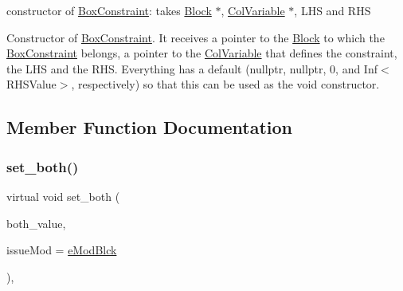 constructor of \mbox{\hyperlink{class_s_m_spp__di__unipi__it_1_1_box_constraint}{Box\+Constraint}}\+: takes \mbox{\hyperlink{class_s_m_spp__di__unipi__it_1_1_block}{Block}} $\ast$, \mbox{\hyperlink{class_s_m_spp__di__unipi__it_1_1_col_variable}{Col\+Variable}} $\ast$, L\+HS and R\+HS 

Constructor of \mbox{\hyperlink{class_s_m_spp__di__unipi__it_1_1_box_constraint}{Box\+Constraint}}. It receives a pointer to the \mbox{\hyperlink{class_s_m_spp__di__unipi__it_1_1_block}{Block}} to which the \mbox{\hyperlink{class_s_m_spp__di__unipi__it_1_1_box_constraint}{Box\+Constraint}} belongs, a pointer to the \mbox{\hyperlink{class_s_m_spp__di__unipi__it_1_1_col_variable}{Col\+Variable}} that defines the constraint, the L\+HS and the R\+HS. Everything has a default (nullptr, nullptr, 0, and Inf$<$\+R\+H\+S\+Value$>$, respectively) so that this can be used as the void constructor. 

\subsection{Member Function Documentation}
\mbox{\label{class_s_m_spp__di__unipi__it_1_1_box_constraint_a6f44fbb5f6b5aebd5f78d7593dc6e000}} 
\subsubsection{\texorpdfstring{set\+\_\+both()}{set\_both()}}
{\footnotesize\ttfamily virtual void set\+\_\+both (\begin{DoxyParamCaption}\item[{\mbox{\hyperlink{class_s_m_spp__di__unipi__it_1_1_row_constraint_a34abd4b01d3a2024be5f6d13dd88779f}{c\+\_\+\+R\+H\+S\+Value}}}]{both\+\_\+value,  }\item[{\mbox{\hyperlink{group___modification___t_y_p_e_s_ga544246d8c462e9a2d817c2c30797968f}{c\+\_\+\+Mod\+Param}}}]{issue\+Mod = {\ttfamily \mbox{\hyperlink{group___modification___t_y_p_e_s_gga48fddcdd03a03f49b7e389ca1ed938d4a21b14b26b1c0093a0905f6fc010bad29}{e\+Mod\+Blck}}} }\end{DoxyParamCaption})\hspace{0.3cm}{\ttfamily [override]}, {\ttfamily [virtual]}}



